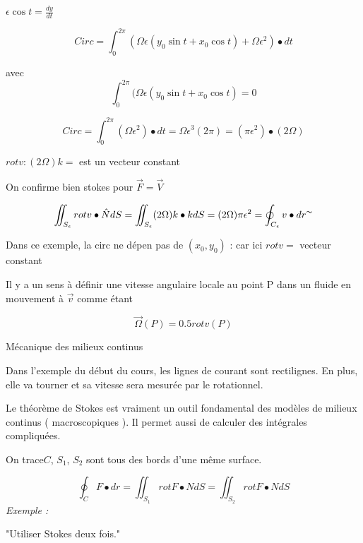 $\epsilon \cos t =\frac{dy}{dt}$




\[Circ = \int_0^{2\pi} (\Omega \epsilon ( y_0 \sin t + x_0 \cos t ) + \Omega \epsilon ^2 )\bullet dt \]

avec \[ \int_0^{2\pi} (\Omega \epsilon ( y_0 \sin t + x_0 \cos t )  = 0\]


\[Circ = \int_0^{2\pi} ( \Omega \epsilon ^2 )\bullet dt = \Omega \epsilon^3 ( 2 \pi ) = (\pi \epsilon^2 )\bullet ( 2 \Omega ) \]

\begin{myrem}
$rot v : ( 2 \Omega ) k = $ est un vecteur constant

On confirme bien stokes pour $\vec F = \vec V $


\[\iint_{S_{\epsilon}} rot v \bullet \hat N dS = \iint_{S_{\epsilon}} (2\Omega) k\bullet k dS = (2 \Omega ) \pi \epsilon ^2 = \oint_{C_{\epsilon}} v\bullet dr^{\thicksim} \]

\end{myrem}

\begin{myrem}


Dans ce exemple, la circ ne dépen pas de $(x_0,y_0)$ : car ici $ rot v = $ vecteur constant
\end{myrem}

\begin{myrem}

Il y a un sens à définir une vitesse angulaire locale au point P dans un fluide en mouvement à $\vec v$ comme étant

$$\vec \Omega (P) = 0.5 rot v (P) $$

Mécanique des milieux continus
\end{myrem}

\begin{myrem}
Dans l'exemple du début du cours, les lignes de courant sont rectilignes. En plus, elle va tourner et sa vitesse sera mesurée par le rotationnel.
\end{myrem}


Le théorème de Stokes est vraiment un outil fondamental des modèles de milieux continus ( macroscopiques ). Il permet aussi de calculer des intégrales compliquées.

On trace$C$, $S_1$, $S_2$ sont tous des bords d'une même surface.

\[\oint_C F \bullet dr = \iint_{S_1}rot F \bullet N dS = \iint_{S_2}rot F \bullet N dS\]
\textit{
Exemple : }

"Utiliser Stokes deux fois."

